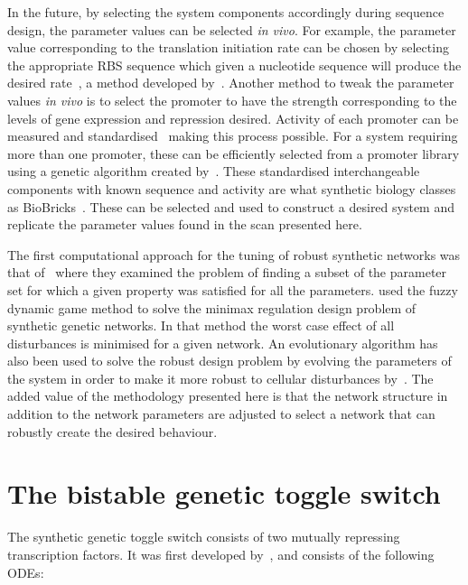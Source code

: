  In the future, by selecting the system components accordingly during sequence design, the parameter values can be selected \textit{in vivo}. For example, the parameter value corresponding to the translation initiation rate can be chosen by selecting the appropriate RBS sequence which given a nucleotide sequence will produce the desired rate~\autocite{Holtz:2010bm}, a method developed by~\textcite{Salis:2009gk}. Another method to tweak the parameter values \textit{in vivo} is to select the promoter to have the strength corresponding to the levels of gene expression and repression desired. Activity of each promoter can be measured and standardised~\autocite{Kelly:2009bj} making this process possible. For a system requiring more than one promoter, these can be efficiently selected from a promoter library using a genetic algorithm created by~\textcite{Wu:2011bq}. These standardised interchangeable components with known sequence and activity are what synthetic biology classes as BioBricks~\autocite{Kelly:2009bj,Canton:2008fv}. These can be selected and used to construct a desired system and replicate the parameter values found in the scan presented here.

The first computational approach for the tuning of robust synthetic networks was that of~\textcite{Batt:2007jl} where they examined the problem of finding a subset of the parameter set for which a given property was satisfied for all the parameters. \textcite{Chen:2009ea} used the fuzzy  dynamic game method to solve the minimax regulation design problem of synthetic genetic networks. In that method the worst case effect of all disturbances is minimised for a given network. An evolutionary algorithm has also been used to solve the robust design problem by evolving the parameters of the system in order to make it more robust to cellular disturbances by~\textcite{Wu:2011bq}. The added value of the methodology presented here is that the network structure in addition to the network parameters are adjusted to select a network that can robustly create the desired behaviour.	

\section{The bistable genetic toggle switch}
The synthetic genetic toggle switch consists of two mutually repressing transcription factors. It was first developed by~\textcite{Gardner:2000vha}, and consists of the following ODEs:

